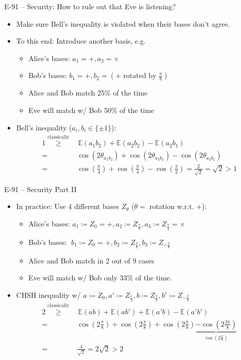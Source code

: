 \documentclass{beamer}
\begin{document}
	\begin{frame}{E-91 – Security: How to rule out that Eve is listening?}
		\begin{itemize}
			\item Make sure Bell's inequality is violated when their
			bases don't agree.
			\item<2-> To this end: Introduce another basis, e.g.
				\begin{itemize}
					\item Alice's bases: $a_1 = +, a_2 = \times$
					\item Bob's bases: $b_1 = +, b_2 = (+ \text{ rotated by } \frac{\pi}{8})$
					\item Alice and Bob match 25\% of the time
					\item Eve will match w/ Bob 50\% of the time
				\end{itemize}
			\item<3-> Bell's inequality ($a_i, b_i \in \{\pm 1\}$):
				\begin{align*}
					1 \overset{\text{classically}}{\geq}&\, \mathbb{E}(a_1 b_2) + \mathbb{E}(a_2 b_2) - \mathbb{E}(a_2 b_1) \\
					=& \cos(2 \theta_{a_1 b_2}) + \cos(2 \theta_{a_2 b_2}) - \cos(2 \theta_{a_2 b_1}) \\
					=& \cos(\frac{\pi}{4}) + \cos(\frac{\pi}{4}) - \cos(\frac{\pi}{2})
					= \frac{2}{\sqrt{2}} = \sqrt{2} > 1
				\end{align*}
		\end{itemize}
	\end{frame}

	\begin{frame}{E-91 – Security Part II}
		\begin{itemize}
			\item In practice: Use 4 different bases $Z_\theta$ ($\theta =$ rotation w.r.t. $+$):
				\begin{itemize}
					\item Alice's bases: $a_1 \coloneqq Z_0 = +, a_2 \coloneqq Z_{\frac{\pi}{8}}, a_3 \coloneqq Z_{\frac{\pi}{4}} = \times$
					\item Bob's bases: $\;b_1 \coloneqq Z_0 = +, b_2 \coloneqq Z_{\frac{\pi}{8}}, b_3 \coloneqq Z_{-\frac{\pi}{8}}$
					\item Alice and Bob match in 2 out of 9 cases
					\item Eve will match w/ Bob only 33\% of the time.
				\end{itemize}
			\item<2-> CHSH inequality w/ $a \coloneqq Z_0, a' \coloneqq Z_{\frac{\pi}{4}}, b \coloneqq Z_{\frac{\pi}{8}}, b' \coloneqq Z_{-\frac{\pi}{8}}$
				\begin{align*}
					2 \overset{\text{classically}}{\geq}&\, \mathbb{E}(a b) + \mathbb{E}(a b') + \mathbb{E}(a' b) - \mathbb{E}(a' b') \\
					=& \cos(2\frac{\pi}{8}) + \cos(2\frac{\pi}{8}) + \cos(2\frac{\pi}{8}) \underbrace{- \cos(2\frac{3\pi}{8})}_{\cos(2\frac{\pi}{8})} \\
					=& \frac{4}{\sqrt{2}} = 2\sqrt{2} > 2
				\end{align*}
		\end{itemize}
	\end{frame}
\end{document}
